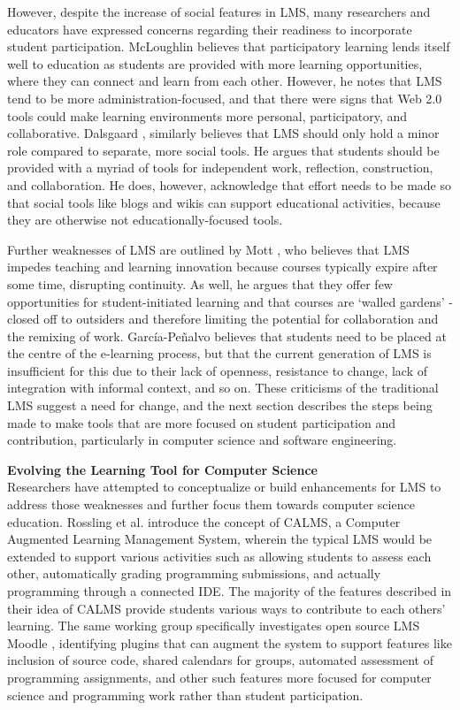 However, despite the increase of social features in LMS, many researchers and educators have expressed concerns regarding their readiness to incorporate student participation. McLoughlin \cite{mcloughlin2007social} believes that participatory learning lends itself well to education as students are provided with more learning opportunities, where they can connect and learn from each other. However, he notes that LMS tend to be more administration-focused, and that there were signs that Web 2.0 tools could make learning environments more personal, participatory, and collaborative. Dalsgaard \cite{dalsgaard2006social}, similarly believes that LMS should only hold a minor role compared to separate, more social tools. He argues that students should be provided with a myriad of tools for independent work, reflection, construction, and collaboration. He does, however, acknowledge that effort needs to be made so that social tools like blogs and wikis can support educational activities, because they are otherwise not educationally-focused tools.

Further weaknesses of LMS are outlined by Mott \cite{mott2010envisioning}, who believes that LMS impedes teaching and learning innovation because courses typically expire after some time, disrupting continuity. As well, he argues that they offer few opportunities for student-initiated learning and that courses are `walled gardens' - closed off to outsiders and therefore limiting the potential for collaboration and the remixing of work. García-Peñalvo \cite{garcia2011opening} believes that students need to be placed at the centre of the e-learning process, but that the current generation of LMS is insufficient for this due to their lack of openness, resistance to change, lack of integration with informal context, and so on. These criticisms of the traditional LMS suggest a need for change, and the next section describes the steps being made to make tools that are more focused on student participation and contribution, particularly in computer science and software engineering.

\textbf{Evolving the Learning Tool for Computer Science} \\

Researchers have attempted to conceptualize or build enhancements for LMS to address those weaknesses and further focus them towards computer science education. Rossling et al. \cite{rossling2008enhancing} introduce the concept of CALMS, a Computer Augmented Learning Management System, wherein the typical LMS would be extended to support various activities such as allowing students to assess each other, automatically grading programming submissions, and actually programming through a connected IDE. The majority of the features described in their idea of CALMS provide students various ways to contribute to each others' learning. The same working group specifically investigates open source LMS Moodle \cite{rossling2010adapting}, identifying plugins that can augment the system to support features like inclusion of source code, shared calendars for groups, automated assessment of programming assignments, and other such features more focused for computer science and programming work rather than student participation.

